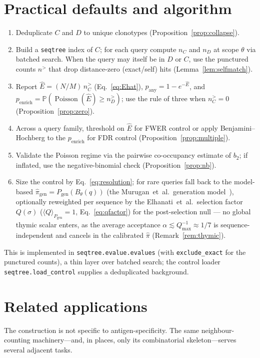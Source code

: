 \documentclass[11pt]{article}
\theoremstyle{oldplain}
\theoremstyle{oldrem}
\DeclareMathOperator{\Poisson}{Poisson}
\newcommand{\Pgen}{P_{\mathrm{gen}}}
\newcommand{\ball}[2]{B_{#1}(#2)}
\newcommand{\Prob}{\mathbb{P}}
\begin{document}
\section{Practical defaults and algorithm}\label{sec:practice}

\begin{enumerate}
  \item Deduplicate $C$ and $D$ to unique clonotypes (Proposition~\ref{prop:collapse}).
  \item Build a \texttt{seqtree} index of $C$; for each query compute $n_C$ and $n_D$ at scope
  $\theta$ via batched search. When the query may itself be in $D$ or $C$, use the punctured counts
  $n^{>}$ that drop distance-zero (exact/self) hits (Lemma~\ref{lem:selfmatch}).
  \item Report $\widehat E=(N/M)\,n_C^{>}$ (Eq.~\eqref{eq:Ehat}), $p_{\mathrm{any}}=1-e^{-\widehat E}$,
  and $p_{\mathrm{enrich}}=\Prob(\Poisson(\widehat E)\ge n_D^{>})$; use the rule of three when
  $n_C^{>}=0$ (Proposition~\ref{prop:zero}).
  \item Across a query family, threshold on $\widehat E$ for FWER control or apply
  Benjamini--Hochberg to the $p_{\mathrm{enrich}}$ for FDR control (Proposition~\ref{prop:multiple}).
  \item Validate the Poisson regime via the pairwise co-occupancy estimate of $b_2$; if inflated,
  use the negative-binomial check (Proposition~\ref{prop:nb}).
  \item Size the control by Eq.~\eqref{eq:resolution}; for rare queries fall back to the model-based
  $\hat\pi_{\mathrm{gen}}=\Pgen(\ball{\theta}{q})$ (the Murugan~et~al.\ generation
  model~\cite{Murugan2012}), optionally reweighted per sequence by the Elhanati~et~al.\ selection
  factor $Q(\sigma)$ ($\langle Q\rangle_{\Pgen}=1$, Eq.~\eqref{eq:qfactor}) for the post-selection
  null --- no global thymic scalar enters, as the average acceptance $\alpha\lesssim Q_{\max}^{-1}
  \approx1/7$ is sequence-independent and cancels in the calibrated $\hat\pi$ (Remark~\ref{rem:thymic}).
\end{enumerate}

This is implemented in \texttt{seqtree.evalue.evalues} (with \texttt{exclude\_exact} for the punctured
counts), a thin layer over batched search; the control loader \texttt{seqtree.load\_control} supplies
a deduplicated background.

\section{Related applications}\label{sec:related}
The construction is not specific to antigen-specificity. The same neighbour-counting machinery---and,
in places, only its combinatorial skeleton---serves several adjacent tasks.
\end{document}
